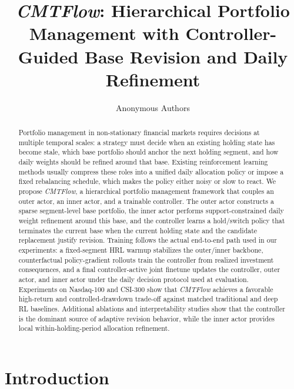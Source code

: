 \documentclass[letterpaper]{article} %
\title{\textit{CMTFlow}: Hierarchical Portfolio Management with Controller-Guided Base Revision and Daily Refinement}
\author{
    Anonymous Authors
}
\begin{document}
\maketitle

\begin{abstract}
Portfolio management in non-stationary financial markets requires decisions at multiple temporal scales: a strategy must decide when an existing holding state has become stale, which base portfolio should anchor the next holding segment, and how daily weights should be refined around that base. Existing reinforcement learning methods usually compress these roles into a unified daily allocation policy or impose a fixed rebalancing schedule, which makes the policy either noisy or slow to react. We propose \textit{CMTFlow}, a hierarchical portfolio management framework that couples an outer actor, an inner actor, and a trainable controller. The outer actor constructs a sparse segment-level base portfolio, the inner actor performs support-constrained daily weight refinement around this base, and the controller learns a hold/switch policy that terminates the current base when the current holding state and the candidate replacement justify revision. Training follows the actual end-to-end path used in our experiments: a fixed-segment HRL warmup stabilizes the outer/inner backbone, counterfactual policy-gradient rollouts train the controller from realized investment consequences, and a final controller-active joint finetune updates the controller, outer actor, and inner actor under the daily decision protocol used at evaluation. Experiments on Nasdaq-100 and CSI-300 show that \textit{CMTFlow} achieves a favorable high-return and controlled-drawdown trade-off against matched traditional and deep RL baselines. Additional ablations and interpretability studies show that the controller is the dominant source of adaptive revision behavior, while the inner actor provides local within-holding-period allocation refinement.
\end{abstract}

\section{Introduction}
\end{document}
